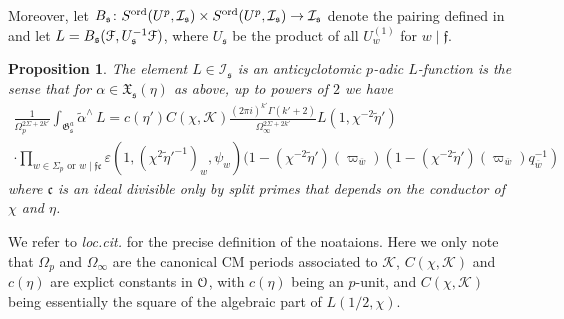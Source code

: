 \documentclass[leqno]{amsart}
\newtheorem{prop}[thm]{Proposition}
\theoremstyle{definition}
\theoremstyle{remark}
\newcommand{\eo}{\EuScript{O}}
\newcommand{\fc}{\mathfrak{c}}
\newcommand{\ff}{\mathfrak{f}}
\newcommand{\fs}{\mathfrak{s}}
\newcommand{\K}{{\mathcal{K}}} %
\newcommand{\bw}{\overline{w}}
\newcommand{\fG}{\mathfrak{G}}
\newcommand{\fX}{\mathfrak{X}}
\newcommand{\euF}{\EuScript{F}} %
\newcommand{\I}{\mathcal{I}} %
\newcommand{\ord}{\textnormal{ord}} %
\begin{document}
Moreover, let
$B_\fs\colon S^{\ord}(U^p,\I_\fs)\times 
S^{\ord}(U^p,\I_\fs)\to\I_\fs$ 
denote the pairing defined in \cite[\S 6.4.1]{lee}
and let $L=B_\fs(\euF,U_\fs^{-1}\euF)$,
where $U_{\fs}$ be the product of all $U_w^{(1)}$ for $w\mid\ff$.
\begin{prop}\cite[Thm 7.7]{lee}\label{prop:function}
The element $L\in \I_\fs$
is an anticyclotomic $p$-adic $L$-function is the sense that
for $\alpha\in \fX_\fs(\eta)$ as above,
up to powers of $2$ we have
\begin{multline*}
	\frac{1}{\Omega_p^{2\Sigma+2k'}}
	\int_{\fG_{\fs}^a}\tilde{\alpha}^\wedge\,L=
	c(\eta')C(\chi,\K)
	\frac{(2\pi i)^{k'}\Gamma(k'+2)
	}{\Omega_\infty^{2\Sigma+2k'}}
    L(1,\chi^{-2}\tilde{\eta}')\\\cdot
	\prod_{w\in\Sigma_p\text{ or }w\mid\ff\fc}
	\varepsilon(1,(\chi^{2}\tilde{\eta}'^{-1})_w,\psi_w)
	(1-(\chi^{-2}\tilde{\eta}')(\varpi_{\bw})
	(1-(\chi^{-2}\tilde{\eta}')(\varpi_{\bw})q_{\bw}^{-1})
\end{multline*}
where $\fc$ is an ideal divisible only by split primes
that depends on the conductor of $\chi$ and $\eta$.
\end{prop}
We refer to \textit{loc.cit.} for the precise definition
of the noataions.
Here we only note that
$\Omega_p$ and $\Omega_\infty$
are the canonical CM periods associated to $\K$,
$C(\chi,\K)$ and $c(\eta)$ are explict constants in $\eo$,
with $c(\eta)$ being an $p$-unit,
and $C(\chi,\K)$ being
essentially the square of the algebraic part
of $L(1/2,\chi)$.
\end{document}
